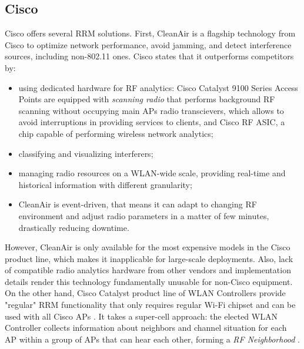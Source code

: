 \subsection{Cisco}
Cisco offers several RRM solutions.
First, CleanAir is a flagship technology from Cisco \cite{CiscoCleanAirTechnology2014} to optimize network performance, avoid jamming, and detect interference sources, including non-802.11 ones. Cisco states that it outperforms competitors by:
\begin{itemize}
    \item using dedicated hardware for RF analytics: Cisco Catalyst 9100 Series Access Points are equipped with \textit{scanning radio} that performs background RF scanning without occupying main APs radio transcievers, which allows to avoid interruptions in providing services to clients, and Cisco RF ASIC, a chip capable of performing wireless network analytics;
    \item classifying and visualizing interferers;
    \item managing radio resources on a WLAN-wide scale, providing real-time and historical information with different granularity;
    \item CleanAir is event-driven, that means it can adapt to changing RF environment and adjust radio parameters in a matter of few minutes, drastically reducing downtime.
\end{itemize}
However, CleanAir is only available for the most expensive models in the Cisco product line, which makes it inapplicable for large-scale deployments. Also, lack of compatible radio analytics hardware from other vendors and implementation details render this technology fundamentally unusable for non-Cisco equipment.
On the other hand, Cisco Catalyst product line of WLAN Controllers provide "regular" RRM functionality that only requires regular Wi-Fi chipset and can be used with all Cisco APs \cite{ciscoRadioResourceManagement}. It takes a super-cell approach: the elected WLAN Controller collects information about neighbors and channel situation for each AP within a group of APs that can hear each other, forming a \textit{RF Neighborhood}  \cite{arenaUnderstandingTroubleshootingCisco2022}.

